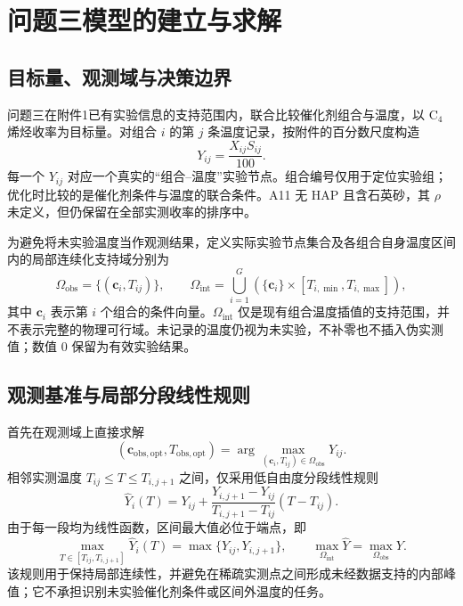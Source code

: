 \section{问题三模型的建立与求解}

\subsection{目标量、观测域与决策边界}

问题三在附件1已有实验信息的支持范围内，联合比较催化剂组合与温度，以 $\mathrm{C}_4$ 烯烃收率为目标量。对组合 $i$ 的第 $j$ 条温度记录，按附件的百分数尺度构造
\begin{equation}
  Y_{ij}=\frac{X_{ij}S_{ij}}{100}.
  \label{eq:q3-yield}
\end{equation}
每一个 $Y_{ij}$ 对应一个真实的“组合--温度”实验节点。组合编号仅用于定位实验组；优化时比较的是催化剂条件与温度的联合条件。A11 无 HAP 且含石英砂，其 $\rho$ 未定义，但仍保留在全部实测收率的排序中。

为避免将未实验温度当作观测结果，定义实际实验节点集合及各组合自身温度区间内的局部连续化支持域分别为
\begin{equation}
 \Omega_{\mathrm{obs}}=\{(\mathbf{c}_i,T_{ij})\},
 \qquad
 \Omega_{\mathrm{int}}=\bigcup_{i=1}^{G}\left(\{\mathbf{c}_i\}\times[T_{i,\min},T_{i,\max}]\right),
 \label{eq:q3-domains}
\end{equation}
其中 $\mathbf{c}_i$ 表示第 $i$ 个组合的条件向量。$\Omega_{\mathrm{int}}$ 仅是现有组合温度插值的支持范围，并不表示完整的物理可行域。未记录的温度仍视为未实验，不补零也不插入伪实测值；数值 0 保留为有效实验结果。

\subsection{观测基准与局部分段线性规则}

首先在观测域上直接求解
\begin{equation}
 (\mathbf{c}_{\mathrm{obs,opt}},T_{\mathrm{obs,opt}})
 =\arg\max_{(\mathbf{c}_{i},T_{ij})\in\Omega_{\mathrm{obs}}}Y_{ij}.
 \label{eq:q3-observed-optimum}
\end{equation}
相邻实测温度 $T_{ij}\leq T\leq T_{i,j+1}$ 之间，仅采用低自由度分段线性规则
\begin{equation}
 \widehat{Y}_{i}(T)=Y_{ij}+
 \frac{Y_{i,j+1}-Y_{ij}}{T_{i,j+1}-T_{ij}}(T-T_{ij}).
 \label{eq:q3-piecewise-linear}
\end{equation}
由于每一段均为线性函数，区间最大值必位于端点，即
\begin{equation}
 \max_{T\in[T_{ij},T_{i,j+1}]}\widehat{Y}_{i}(T)
 =\max\{Y_{ij},Y_{i,j+1}\},
 \qquad
 \max_{\Omega_{\mathrm{int}}}\widehat{Y}=\max_{\Omega_{\mathrm{obs}}}Y.
 \label{eq:q3-no-artificial-peak}
\end{equation}
该规则用于保持局部连续性，并避免在稀疏实测点之间形成未经数据支持的内部峰值；它不承担识别未实验催化剂条件或区间外温度的任务。

